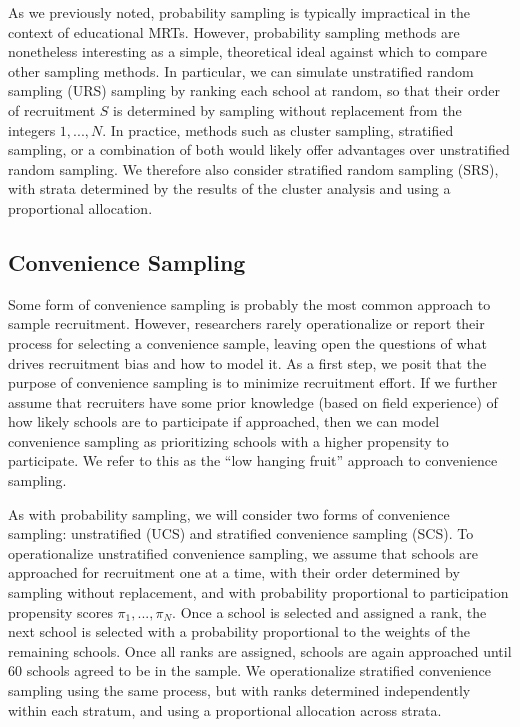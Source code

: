 \documentclass[
  english,
  man,floatsintext]{apa6}
\begin{document}
As we previously noted, probability sampling is typically impractical in the context of educational MRTs. However, probability sampling methods are nonetheless interesting as a simple, theoretical ideal against which to compare other sampling methods. In particular, we can simulate unstratified random sampling (URS) sampling by ranking each school at random, so that their order of recruitment \(S\) is determined by sampling without replacement from the integers \(1,...,N\). In practice, methods such as cluster sampling, stratified sampling, or a combination of both would likely offer advantages over unstratified random sampling. We therefore also consider stratified random sampling (SRS), with strata determined by the results of the cluster analysis and using a proportional allocation.

\hypertarget{convenience-sampling}{%
\subsection{Convenience Sampling}\label{convenience-sampling}}

Some form of convenience sampling is probably the most common approach to sample recruitment.
However, researchers rarely operationalize or report their process for selecting a convenience sample, leaving open the questions of what drives recruitment bias and how to model it. As a first step, we posit that the purpose of convenience sampling is to minimize recruitment effort. If we further assume that recruiters have some prior knowledge (based on field experience) of how likely schools are to participate if approached, then we can model convenience sampling as prioritizing schools with a higher propensity to participate. We refer to this as the \enquote{low hanging fruit} approach to convenience sampling.

As with probability sampling, we will consider two forms of convenience sampling: unstratified (UCS) and stratified convenience sampling (SCS). To operationalize unstratified convenience sampling, we assume that schools are approached for recruitment one at a time, with their order determined by sampling without replacement, and with probability proportional to participation propensity scores \(\pi_1,...,\pi_N\).
Once a school is selected and assigned a rank, the next school is selected with a probability proportional to the weights of the remaining schools. Once all ranks are assigned, schools are again approached until 60 schools agreed to be in the sample. We operationalize stratified convenience sampling using the same process, but with ranks determined independently within each stratum, and using a proportional allocation across strata.
\end{document}
